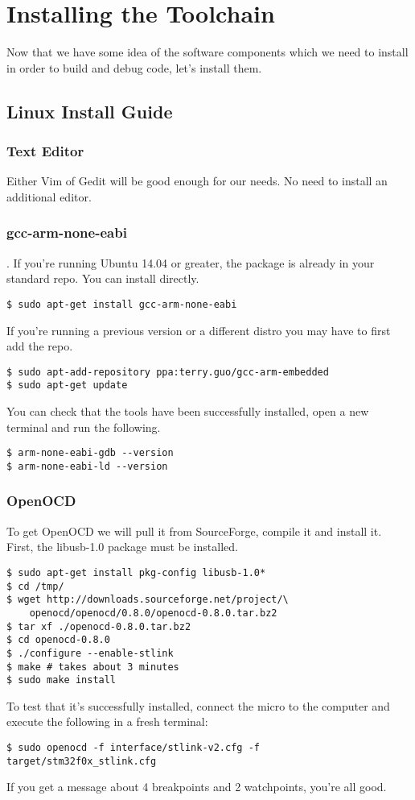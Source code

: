 \chapter{Installing the Toolchain}
Now that we have some idea of the software components which we need to install in order to build and debug code, let's install them.

\section{Linux Install Guide}
\subsection{Text Editor}
Either Vim of Gedit will be good enough for our needs. No need to install an additional editor.

\subsection{gcc-arm-none-eabi}.
If you're running Ubuntu 14.04 or greater, the package is already in your standard repo. You can install directly.
\begin{lstlisting}[style=BashStyle]
$ sudo apt-get install gcc-arm-none-eabi
\end{lstlisting}
If you're running a previous version or a different distro you may have to first add the repo.
\begin{lstlisting}[style=BashStyle]
$ sudo apt-add-repository ppa:terry.guo/gcc-arm-embedded
$ sudo apt-get update
\end{lstlisting}
You can check that the tools have been successfully installed, open a new terminal and run the following. 
\begin{lstlisting}[style=BashStyle]
$ arm-none-eabi-gdb --version
$ arm-none-eabi-ld --version
\end{lstlisting}

\subsection{OpenOCD}
To get OpenOCD we will pull it from SourceForge, compile it and install it. First, the libusb-1.0 package must be installed.
\begin{lstlisting}[style=BashStyle]
$ sudo apt-get install pkg-config libusb-1.0*
$ cd /tmp/
$ wget http://downloads.sourceforge.net/project/\
    openocd/openocd/0.8.0/openocd-0.8.0.tar.bz2
$ tar xf ./openocd-0.8.0.tar.bz2 
$ cd openocd-0.8.0
$ ./configure --enable-stlink
$ make # takes about 3 minutes
$ sudo make install
\end{lstlisting}
To test that it's successfully installed, connect the micro to the computer and execute the following in a fresh terminal:
\begin{lstlisting}[style=BashStyle]
$ sudo openocd -f interface/stlink-v2.cfg -f target/stm32f0x_stlink.cfg
\end{lstlisting}
If you get a message about 4 breakpoints and 2 watchpoints, you're all good.


